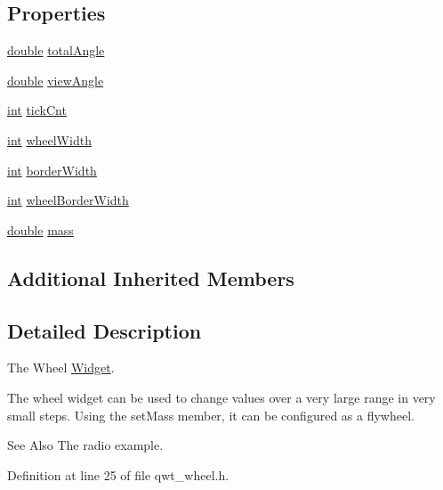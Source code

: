 \subsection*{Properties}
\begin{DoxyCompactItemize}
\item 
\hyperlink{_super_l_u_support_8h_a8956b2b9f49bf918deed98379d159ca7}{double} \hyperlink{class_qwt_wheel_a6368f57f26c11e6577561fd584437cf3}{total\-Angle}
\item 
\hyperlink{_super_l_u_support_8h_a8956b2b9f49bf918deed98379d159ca7}{double} \hyperlink{class_qwt_wheel_a63443dce4fcacb2a763de6c0aef10aee}{view\-Angle}
\item 
\hyperlink{ioapi_8h_a787fa3cf048117ba7123753c1e74fcd6}{int} \hyperlink{class_qwt_wheel_a8206b01fb1fbdd216b640136a780640e}{tick\-Cnt}
\item 
\hyperlink{ioapi_8h_a787fa3cf048117ba7123753c1e74fcd6}{int} \hyperlink{class_qwt_wheel_ac6209286cc86f618e6866a4b6164d896}{wheel\-Width}
\item 
\hyperlink{ioapi_8h_a787fa3cf048117ba7123753c1e74fcd6}{int} \hyperlink{class_qwt_wheel_acc48deaf20aee5957e81bd718bfbc207}{border\-Width}
\item 
\hyperlink{ioapi_8h_a787fa3cf048117ba7123753c1e74fcd6}{int} \hyperlink{class_qwt_wheel_a5ab122a2d17ca9a985715f6c777c0183}{wheel\-Border\-Width}
\item 
\hyperlink{_super_l_u_support_8h_a8956b2b9f49bf918deed98379d159ca7}{double} \hyperlink{class_qwt_wheel_abbe2348e811c6448ed33fd8706312e57}{mass}
\end{DoxyCompactItemize}
\subsection*{Additional Inherited Members}


\subsection{Detailed Description}
The Wheel \hyperlink{class_widget}{Widget}. 

The wheel widget can be used to change values over a very large range in very small steps. Using the set\-Mass member, it can be configured as a flywheel.

\begin{DoxySeeAlso}{See Also}
The radio example. 
\end{DoxySeeAlso}


Definition at line 25 of file qwt\-\_\-wheel.\-h.



